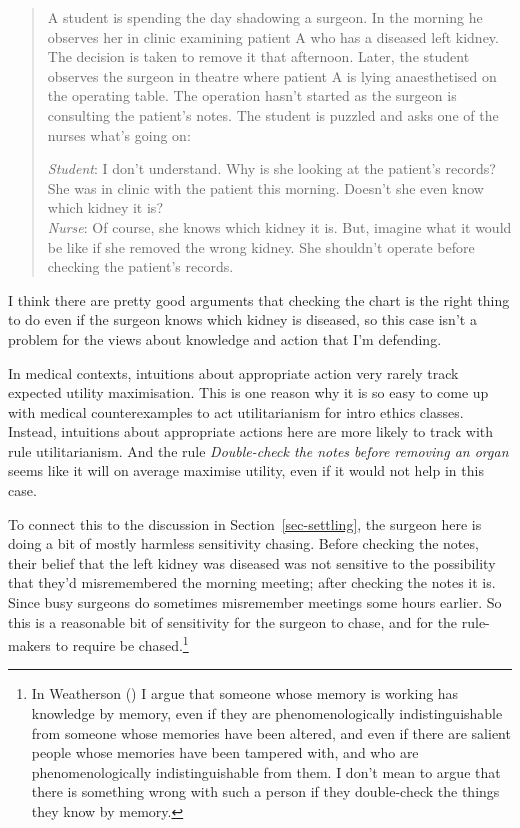 \documentclass[
  12pt,
  letterpaper,
]{scrbook}
\begin{document}
\begin{quote}
A student is spending the day shadowing a surgeon. In the morning he
observes her in clinic examining patient A who has a diseased left
kidney. The decision is taken to remove it that afternoon. Later, the
student observes the surgeon in theatre where patient A is lying
anaesthetised on the operating table. The operation hasn't started as
the surgeon is consulting the patient's notes. The student is puzzled
and asks one of the nurses what's going on:

\emph{Student}: I don't understand. Why is she looking at the patient's
records? She was in clinic with the patient this morning. Doesn't she
even know which kidney it is?\\
\emph{Nurse}: Of course, she knows which kidney it is. But, imagine what
it would be like if she removed the wrong kidney. She shouldn't operate
before checking the patient's records.
\end{quote}

I think there are pretty good arguments that checking the chart is the
right thing to do even if the surgeon knows which kidney is diseased, so
this case isn't a problem for the views about knowledge and action that
I'm defending.

In medical contexts, intuitions about appropriate action very rarely
track expected utility maximisation. This is one reason why it is so
easy to come up with medical counterexamples to act utilitarianism for
intro ethics classes. Instead, intuitions about appropriate actions here
are more likely to track with rule utilitarianism. And the rule
\emph{Double-check the notes before removing an organ} seems like it
will on average maximise utility, even if it would not help in this
case.

To connect this to the discussion in Section~\ref{sec-settling}, the
surgeon here is doing a bit of mostly harmless sensitivity chasing.
Before checking the notes, their belief that the left kidney was
diseased was not sensitive to the possibility that they'd misremembered
the morning meeting; after checking the notes it is. Since busy surgeons
do sometimes misremember meetings some hours earlier. So this is a
reasonable bit of sensitivity for the surgeon to chase, and for the
rule-makers to require be chased.\footnote{In Weatherson
  () I argue that someone whose
  memory is working has knowledge by memory, even if they are
  phenomenologically indistinguishable from someone whose memories have
  been altered, and even if there are salient people whose memories have
  been tampered with, and who are phenomenologically indistinguishable
  from them. I don't mean to argue that there is something wrong with
  such a person if they double-check the things they know by memory.}
\end{document}
